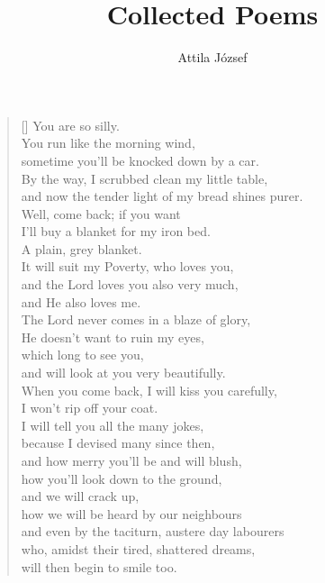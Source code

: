 \documentclass[a4paper,12pt,twoside,final]{book}
\title{Collected Poems}
\author{Attila József}
\begin{document}
\maketitle


\chapter{}


\settowidth{\versewidth}{and now the tender light of my bread shines purer.}

\begin{verse}[\versewidth]
  You are so silly. \\
  You run like the morning wind, \\
  sometime you'll be knocked down by a car. \\
  By the way, I scrubbed clean my little table, \\
  and now the tender light of my bread shines purer. \\
  Well, come back; if you want \\
  I'll buy a blanket for my iron bed. \\
  A plain, grey blanket. \\
  It will suit my Poverty, who loves you, \\
  and the Lord loves you also very much, \\
  and He also loves me. \\
  The Lord never comes in a blaze of glory, \\
  He doesn't want to ruin my eyes, \\
  which long to see you, \\
  and will look at you very beautifully. \\
  When you come back, I will kiss you carefully, \\
  I won't rip off your coat. \\
  I will tell you all the many jokes, \\
  because I devised many since then, \\
  and how merry you'll be and will blush, \\
  how you'll look down to the ground, \\
  and we will crack up, \\
  how we will be heard by our neighbours \\
  and even by the taciturn, austere day labourers \\
  who, amidst their tired, shattered dreams, \\
  will then begin to smile too. \\
\end{verse}
\end{document}
